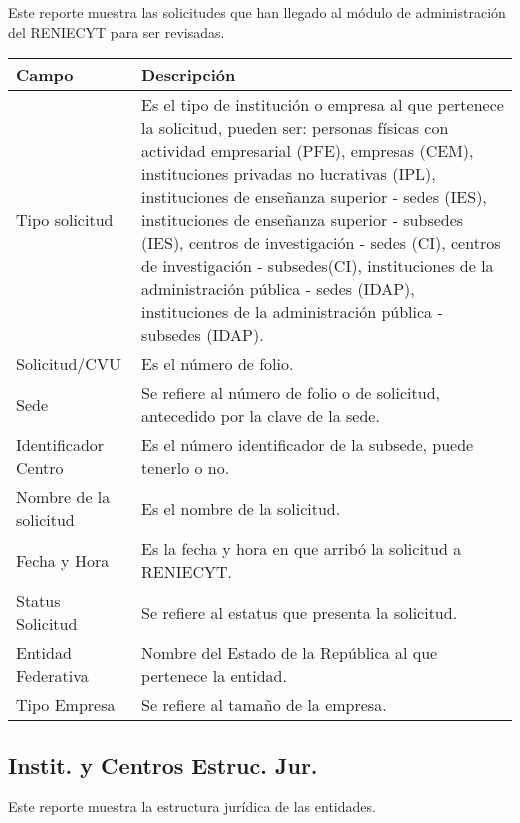 Este reporte muestra las solicitudes que han llegado al módulo de administración del RENIECYT para ser revisadas.\\%

\begin{tabular}{ m{} m{}  }%
	\rowcolor{gray1} {\bf Campo} &  {\bf Descripción} \\ \hline \hline

	Tipo solicitud & Es el tipo de institución o empresa al que pertenece la solicitud, pueden ser: personas físicas con actividad empresarial (PFE), empresas (CEM), instituciones privadas no lucrativas (IPL), instituciones de enseñanza superior - sedes (IES), instituciones de enseñanza superior - subsedes (IES), centros de investigación - sedes (CI), centros de investigación - subsedes(CI), instituciones de la administración pública - sedes (IDAP), instituciones de la administración pública - subsedes (IDAP).\\
	\rowcolor{gray1}Solicitud/CVU & Es el número de folio.\\
	Sede & Se refiere al número de folio o de solicitud, antecedido por la clave de la sede.\\
	\rowcolor{gray1}Identificador Centro & Es el número identificador de la subsede, puede tenerlo o no.\\
	Nombre de la solicitud & Es el nombre de la solicitud.\\
	\rowcolor{gray1}Fecha y Hora & Es la fecha y hora en que arribó la solicitud a RENIECYT.\\
    Status Solicitud & Se refiere al estatus que presenta la solicitud.\\
	\rowcolor{gray1}Entidad Federativa & Nombre del Estado de la República al que pertenece la entidad.\\
	Tipo Empresa & Se refiere al tamaño de la empresa.\\
\end{tabular}


\subsection{Instit. y Centros Estruc. Jur.}
\label{appendix:Reportes:PeopleSoft:InstyCentrosEstrucJur}

Este reporte muestra la estructura jurídica de las entidades.\\

